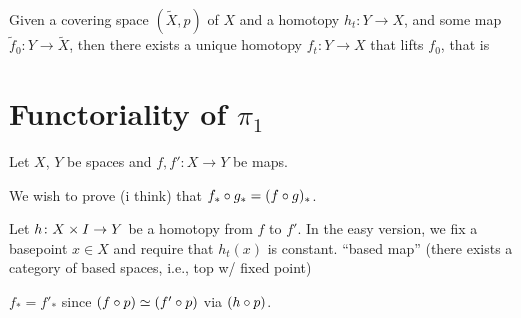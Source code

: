 \documentclass[11pt,leqno,oneside]{amsart}
\newenvironment{dateenv}{
  \vspace{1em}
}{
  \vspace{1em}
}
\newcommand{\mydate}[4]{
  \newdate{#1}{#2}{#3}{#4}
  \begin{dateenv}
    \hfill\displaydate{#1}
  \end{dateenv}
}
\numberwithin{thm}{section}
\newcommand{\homotopic}{\simeq}
\newcommand{\fund}{\pi_1}
\newcommand{\x}{\times}
\begin{document}
\begin{prop}
  Given a covering space \((\tilde{X},p)\) of \(X\) and a homotopy
  \(h_t \colon Y \to X\), and some map
  \(\tilde{f}_0 \colon Y \to \tilde{X}\), then there exists a unique
  homotopy \(f_t \colon Y \to X\) that lifts \(f_0\), that is
  \begin{center}
  \end{center}
\end{prop}

\mydate{d4}{30}{1}{2017}

\section{Functoriality of $\fund$}

Let $X$, $Y$ be spaces and $f,f': X \to Y$ be maps.

We wish to prove (i think) that $f_* \circ g_* = (f \circ g)_*$.

Let $h\from X \x I \to Y$ be a homotopy from $f$ to $f'$.  In the easy version, we fix a basepoint $x \in X$ and require that $h_t(x)$ is constant. ``based map'' (there exists a category of based spaces, i.e., top w/ fixed point)

$f_* = f'_*$ since $(f \of p) \homotopic (f' \of p)$ via $(h \circ p)$.
\end{document}
